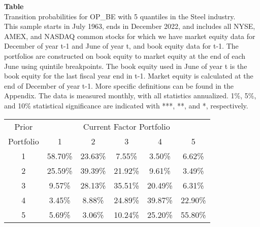\begin{table*}[ht!]
\raggedright
{}
\label{tab: transition_probs_OP_BE_Steel_with_5_quantiles}
\textbf{Table \thetable} \\
Transition probabilities for OP_BE with 5 quantiles in the Steel industry. \\
\hspace*{1em}This sample starts in July 1963, ends in December 2022, and includes all NYSE, AMEX, and NASDAQ common stocks for which we have market equity data for December of year t-1 and June of year t, and book equity data for t-1. The portfolios are constructed on book equity to market equity at the end of each June using quintile breakpoints.  The book equity used in June of year t is the book equity for the last fiscal year end in t-1.  Market equity is calculated at the end of December of year t-1.  More specific definitions can be found in the Appendix.  The data is measured monthly, with all statistics annualized.  1\%, 5\%, and 10\% statistical significance are indicated with ***, **, and *, respectively. \\
\vspace{0.5em}
\centering
\begin{adjustbox}{max width=\textwidth}
\begin{tabular}{@{}cccccc@{}}
\toprule
Prior & \multicolumn{5}{c}{Current Factor Portfolio} \\
Portfolio & 1 & 2 & 3 & 4 & 5 \\
\midrule
1 & 58.70\% & 23.63\% & 7.55\% & 3.50\% & 6.62\% \\
2 & 25.59\% & 39.39\% & 21.92\% & 9.61\% & 3.49\% \\
3 & 9.57\% & 28.13\% & 35.51\% & 20.49\% & 6.31\% \\
4 & 3.45\% & 8.88\% & 24.89\% & 39.87\% & 22.90\% \\
5 & 5.69\% & 3.06\% & 10.24\% & 25.20\% & 55.80\% \\
\bottomrule
\end{tabular}
\end{adjustbox}
\end{table*}